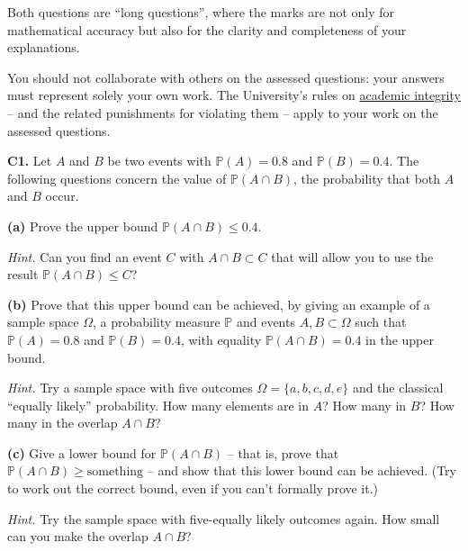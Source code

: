 \documentclass[
  a4paper,
]{book}
\theoremstyle{definition}
\theoremstyle{definition}
\theoremstyle{definition}
\theoremstyle{definition}
\theoremstyle{remark}
\begin{document}
Both questions are ``long questions'', where the marks are not only for mathematical accuracy but also for the clarity and completeness of your explanations.

You should not collaborate with others on the assessed questions: your answers must represent solely your own work. The University's rules on \href{https://library.leeds.ac.uk/info/1401/academic_skills/46/academic_integrity_and_plagiarism}{academic integrity} -- and the related punishments for violating them -- apply to your work on the assessed questions.

\textbf{C1.} Let \(A\) and \(B\) be two events with \(\mathbb P(A) = 0.8\) and \(\mathbb P(B) = 0.4\). The following questions concern the value of \(\mathbb P(A \cap B)\), the probability that both \(A\) and \(B\) occur.

\textbf{(a)} Prove the upper bound \(\mathbb P(A \cap B) \leq 0.4\).

\begin{myanswers}
\emph{Hint.}
Can you find an event \(C\) with \(A \cap B \subset C\) that will allow you to use the result \(\mathbb P(A \cap B) \leq C\)?

\end{myanswers}

\textbf{(b)} Prove that this upper bound can be achieved, by giving an example of a sample space \(\Omega\), a probability measure \(\mathbb P\) and events \(A, B \subset \Omega\) such that \(\mathbb P(A) = 0.8\) and \(\mathbb P(B) = 0.4\), with equality \(\mathbb P(A \cap B) = 0.4\) in the upper bound.

\begin{myanswers}
\emph{Hint.}
Try a sample space with five outcomes \(\Omega = \{a,b,c,d,e\}\) and the classical ``equally likely'' probability. How many elements are in \(A\)? How many in \(B\)? How many in the overlap \(A \cap B\)?

\end{myanswers}

\textbf{(c)} Give a lower bound for \(\mathbb P(A \cap B)\) -- that is, prove that \(\mathbb P(A \cap B) \geq \text{something}\) -- and show that this lower bound can be achieved. (Try to work out the correct bound, even if you can't formally prove it.)

\begin{myanswers}
\emph{Hint.}
Try the sample space with five-equally likely outcomes again. How small can you make the overlap \(A \cap B\)?

\end{myanswers}
\end{document}
